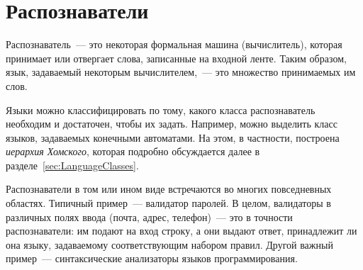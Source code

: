 \section{Распознаватели}
\label{sec:Recognizers}

Распознаватель~--- это некоторая формальная машина (вычислитель), которая принимает или отвергает слова, записанные на входной ленте.
Таким образом, язык, задаваемый некоторым вычислителем,~--- это множество принимаемых им слов.

Языки можно классифицировать по тому, какого класса распознаватель необходим и достаточен, чтобы их задать.
Например, можно выделить класс языков, задаваемых конечными автоматами.
На этом, в частности, построена \emph{иерархия Хомского}, которая подробно обсуждается далее в разделе~\ref{sec:LanguageClasses}.

Распознаватели в том или ином виде встречаются во многих повседневных областях.
Типичный пример~--- валидатор паролей.
В целом, валидаторы в различных полях ввода (почта, адрес, телефон)~--- это в точности распознаватели: им подают на вход строку, а они выдают ответ, принадлежит ли она языку, задаваемому соответствующим набором правил.
Другой важный пример~--- синтаксические анализаторы языков программирования.

